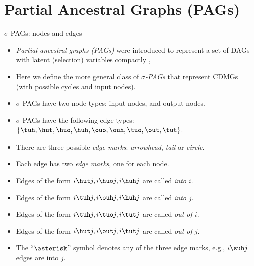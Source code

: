 \section{Partial Ancestral Graphs (PAGs)}
\frame{\sectionpage}

\begin{frame}{$\sigma$-PAGs: nodes and edges}
  \begin{itemize}
    \item \emph{Partial ancestral graphs (PAGs)} were introduced to represent a set of DAGs with latent (selection) variables compactly \cite{SMR1999},
    \item Here we define the more general class of \emph{$\sigma$-PAGs} that represent CDMGs (with possible cycles and input nodes).
  \end{itemize}
  \begin{itemize}
    \item $\sigma$-PAGs have two node types: input nodes, and output nodes.
    \item $\sigma$-PAGs have the following edge types: $\{\tuh,\hut,\huo,\huh,\ouo,\ouh,\tuo,\out,\tut\}$.
    \item There are three possible \emph{edge marks}: \emph{arrowhead}, \emph{tail} or \emph{circle}.
    \item Each edge has two \emph{edge marks}, one for each node.
    \item Edges of the form $i \hut j, i \huo j, i \huh j$ are called \emph{into $i$}.
    \item Edges of the form $i \tuh j, i \ouh j, i \huh j$ are called \emph{into $j$}. 
    \item Edges of the form $i \tuh j, i \tuo j, i \tut j$ are called \emph{out of $i$}.
    \item Edges of the form $i \hut j, i \out j, i \tut j$ are called \emph{out of $j$}.
    \item The ``$\asterisk$'' symbol denotes any of the three edge marks, e.g., $i \suh j$ edges are into $j$.
  \end{itemize}
\end{frame}

